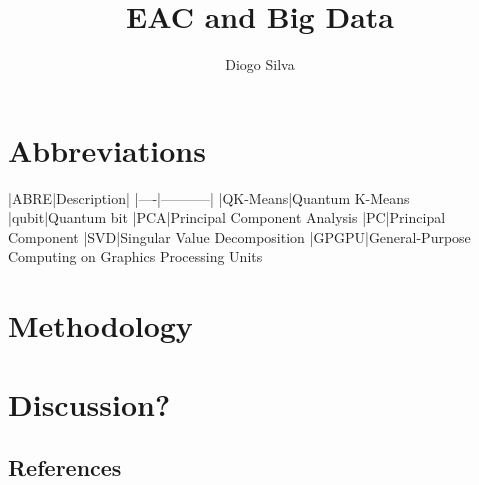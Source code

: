 \documentclass[10pt,a4paper,final]{article}
\author{Diogo Silva}
\title{EAC and Big Data}
\begin{document}
\onehalfspacing %

\section{Abbreviations}

|ABRE|Description|
|----|-----------|
|QK-Means|Quantum K-Means
|qubit|Quantum bit
|PCA|Principal Component Analysis
|PC|Principal Component
|SVD|Singular Value Decomposition
|GPGPU|General-Purpose Computing on Graphics Processing Units



\tableofcontents









\section{Methodology}




\section{Discussion?}

\subsection{References}





\end{document}
